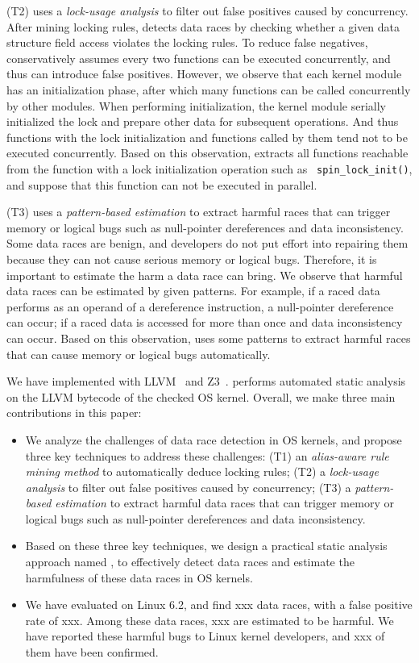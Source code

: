 (T2) \sys uses a {\em lock-usage analysis} to filter out false positives 
caused by concurrency. After mining locking rules, \sys detects data 
races by checking whether a given data structure field access violates the 
locking rules. To reduce false negatives, \sys conservatively assumes 
every two functions can be executed concurrently, and thus can introduce false 
positives. However, we observe that each kernel module has an initialization 
phase, after which many functions can be called concurrently by other modules. 
When performing initialization, the kernel module serially initialized the lock 
and prepare other data for subsequent operations. And thus functions with the 
lock initialization and functions called by them tend not to be executed 
concurrently. Based on this observation, \sys extracts all functions 
reachable from the function with a lock initialization operation such as {\tt 
spin\_lock\_init()}, and suppose that this function can not be executed in 
parallel.

(T3) \sys uses a {\em pattern-based estimation} to extract harmful races 
that can trigger memory or logical bugs such as null-pointer dereferences and 
data inconsistency. Some data races are benign, and developers do not put 
effort into repairing them because they can not cause serious memory or logical 
bugs. Therefore, it is important to estimate the harm a data race can bring. We 
observe that harmful data races can be estimated by given patterns. For 
example, if a raced data performs as an operand of a dereference instruction, a 
null-pointer dereference can occur; if a raced data is accessed for more than 
once and data inconsistency can occur. Based on this observation, \sys 
uses some patterns to extract harmful races that can cause memory or logical 
bugs automatically.

We have implemented \sys with LLVM~\cite{clang} and Z3~\cite{z3}. 
\sys performs automated static analysis on the LLVM bytecode of the 
checked OS kernel. Overall, we make three main contributions in this paper:

\begin{itemize}
	\item We analyze the challenges of data race detection in OS kernels, and 
	propose three key techniques to address	these challenges: (T1) an {\em 
	alias-aware rule mining method} to automatically deduce locking rules; (T2) 
	a {\em lock-usage analysis} to filter out false positives caused by 
	concurrency; (T3) a {\em pattern-based estimation} to extract harmful data 
	races that can trigger memory or logical bugs such as null-pointer 
	dereferences and data inconsistency.
	\item Based on these three key techniques, we design a practical static 
	analysis approach named \sys, to effectively detect data races and 
	estimate the harmfulness of these data races in OS kernels.
	\item We have evaluated \sys on Linux 6.2, and find xxx data races, 	
	with a false positive rate of xxx. Among these data races, xxx are 
	estimated to be harmful. We have reported these harmful bugs to Linux 
	kernel developers, and xxx of them have been confirmed.
\end{itemize}

